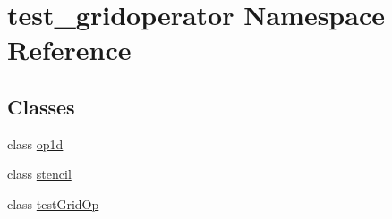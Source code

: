 \hypertarget{namespacetest__gridoperator}{}\section{test\+\_\+gridoperator Namespace Reference}
\label{namespacetest__gridoperator}
\subsection*{Classes}
\begin{DoxyCompactItemize}
\item 
class \hyperlink{classtest__gridoperator_1_1op1d}{op1d}
\item 
class \hyperlink{classtest__gridoperator_1_1stencil}{stencil}
\item 
class \hyperlink{classtest__gridoperator_1_1testGridOp}{test\+Grid\+Op}
\end{DoxyCompactItemize}
